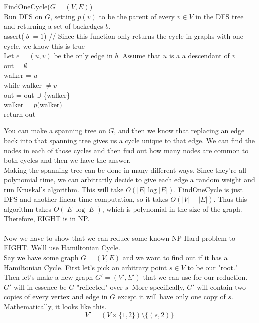 \documentclass[11pt]{article}
\begin{document}
\begin{solution}
\begin{algo}
        \\\\ FindOneCycle($G = (V, E)$) \+
        \\ Run DFS on $G$, setting $p(v)$ to be the parent of every $v \in V$ in the DFS tree
        \\ and returning a set of backedges $b$.
        \\ assert($|b| = 1$) // Since this function only returns the cycle in graphs with one cycle, we know this is true
        \\ Let $e = (u, v)$ be the only edge in $b$. Assume that $u$ is a a descendant of $v$
        \\ out = $\emptyset$
        \\ walker = $u$
        \\ while walker $\not = v$ \+
        \\ out = out $\cup$ \{walker\}
        \\ walker = $p$(walker) \-
        \\ return out
    \end{algo}
    You can make a spanning tree on $G$, and then we know that replacing an edge back into that spanning tree gives us a cycle unique to that edge. We can find the nodes in each of those cycles and then find out how many nodes are common to both cycles and then we have the answer. 
    \\ Making the spanning tree can be done in many different ways. Since they're all polynomial time, we can arbitrarily decide to give each edge a random weight and run Kruskal's algorithm. This will take $O(|E| \log |E|)$. FindOneCycle is just DFS and another linear time computation, so it takes $O(|V| + |E|)$. Thus this algorithm takes $O(|E| \log |E|)$, which is polynomial in the size of the graph. Therefore, EIGHT is in NP.
    \\\\ Now we have to show that we can reduce some known NP-Hard problem to EIGHT. We'll use Hamiltonian Cycle. 
    \\ Say we have some graph $G = (V, E)$ and we want to find out if it has a Hamiltonian Cycle. First let's pick an arbitrary point $s \in V$ to be our "root." Then let's make a new graph $G' = (V', E')$ that we can use for our reduction. $G'$ will in essence be $G$ "reflected" over $s$. More specifically, $G'$ will contain two copies of every vertex and edge in $G$ except it will have only one copy of $s$. Mathematically, it looks like this. 
    \[
        V' = (V \times \{1, 2\}) \setminus \{(s, 2)\}
\]
\end{solution}
\end{document}
